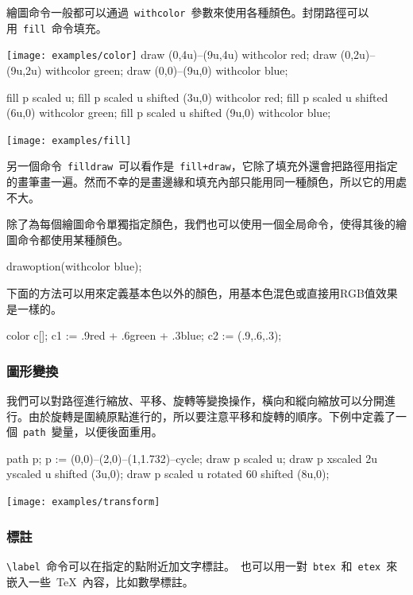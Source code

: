 繪圖命令一般都可以通過~\verb|withcolor|~參數來使用各種顏色。封閉路徑可以用~\verb|fill|~命令填充。

\begin{fdemo}{\texttt{[image: examples/color]}}
draw (0,4u)--(9u,4u) withcolor red;
draw (0,2u)--(9u,2u) withcolor green;
draw (0,0)--(9u,0) withcolor blue;
\end{fdemo}

\begin{code}
fill p scaled u;
fill p scaled u shifted (3u,0) withcolor red;
fill p scaled u shifted (6u,0) withcolor green;
fill p scaled u shifted (9u,0) withcolor blue;
\end{code}

\begin{out}
\texttt{[image: examples/fill]}
\end{out}

另一個命令~\verb|filldraw|~可以看作是~\verb|fill+draw|，它除了填充外還會把路徑用指定的畫筆畫一遍。然而不幸的是畫邊緣和填充內部只能用同一種顏色，所以它的用處不大。

除了為每個繪圖命令單獨指定顏色，我們也可以使用一個全局命令，使得其後的繪圖命令都使用某種顏色。
\begin{code}
drawoption(withcolor blue);
\end{code}

下面的方法可以用來定義基本色以外的顏色，用基本色混色或直接用RGB值效果是一樣的。

\begin{code}
color c[];
c1 := .9red + .6green + .3blue;
c2 := (.9,.6,.3);
\end{code}

\subsubsection{圖形變換}
我們可以對路徑進行縮放、平移、旋轉等變換操作，橫向和縱向縮放可以分開進行。由於旋轉是圍繞原點進行的，所以要注意平移和旋轉的順序。下例中定義了一個~\verb|path|~變量，以便後面重用。

\begin{code}
path p;
p := (0,0)--(2,0)--(1,1.732)--cycle;
draw p scaled u;
draw p xscaled 2u yscaled u shifted (3u,0);
draw p scaled u rotated 60 shifted (8u,0);
\end{code}

\begin{out}
\texttt{[image: examples/transform]}
\end{out}

\subsubsection{標註}
\verb|\label|~命令可以在指定的點附近加文字標註。\MP~也可以用一對~\verb|btex|~和~\verb|etex|~來嵌入一些~\TeX~內容，比如數學標註。

